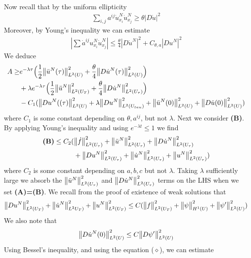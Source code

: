 \documentclass[12pt,a4paper]{report}
\newenvironment{proof}
{\begin{changemargin}{1cm}{0.5cm} 
	}%
	{\end{changemargin}
}
\begin{document}
\begin{proof}
\begin{align*}
\end{align*}
Now recall that by the uniform ellipticity
\begin{align*}
\sum_{i,j}a^{ij}\dot{u}^N_{x_i} \dot{u}^N_{x_j} \geq \theta |D\dot{u}|^2
\end{align*}
Moreover, by Young's inequality we can estimate
\begin{align*}
|\sum \dot{a}^{ij}u^N_{x_i}\dot{u}^N_{x_j}|\leq \frac{\theta}{4} |D\dot{u}^N|^2 + C_{\theta, a}|Du^N|^2
\end{align*}
We deduce
\begin{align*}
A \geq & e^{-\lambda \tau} \Big(\frac{1}{2}\bigl\lVert\ddot{u}^N(\tau)\bigr\rVert_{L^2(U)}^2 + \frac{\theta}{4}\bigl\lVert D\dot{u}^N(\tau)\bigr\rVert_{L^2(U)}^2 \Big) \\
& + \lambda e^{-\lambda \tau}\Big(  \frac{1}{2}\bigl\lVert\ddot{u}^N\bigr\rVert_{L^2(U_T)}^2 + \frac{\theta}{4}\bigl\lVert D\dot{u}^N\bigr\rVert_{L^2(U_{\tau})}^2 \Big) \\
& - C_1 (\bigl\lVert Du^N((\tau)\bigr\rVert_{L^2(U)}^2 + \lambda \bigl\lVert Du^N\bigr\rVert_{L^2(U_{tau})}^2 + \bigl\lVert\ddot{u}^N(0)\bigr\rVert_{L^2(U)}^2 + \bigl\lVert D\dot{u}(0)\bigr\rVert_{L^2(U)}^2)
\end{align*}
where $C_1$ is some constant depending on $\theta, a^{ij}$, but not $\lambda$. Next we consider \textbf{(B)}. By applying Young's inequality and using $e^{-\lambda t} \leq 1$ we find
\begin{align*}
\textbf{(B)} \leq C_2 (&\bigl\lVert\dot{f}\bigr\rVert_{L^2(U_{\tau})}^2 + \bigl\lVert\ddot{u}^N\bigr\rVert_{L^2(U_{\tau})}^2 + \bigl\lVert D\dot{u}^N\bigr\rVert_{L^2(U_{\tau})}^2  \\
& + \bigl\lVert Du^N\bigr\rVert_{L^2(U_{\tau})}^2 + \bigl\lVert\dot{u}^N\bigr\rVert_{L^2(U_{\tau})}^2 + \bigl\lVert u^N\bigr\rVert_{L^2(U_{\tau})}^2 )
\end{align*}
where $C_2$ is some constant depending on $a,b,c$ but not $\lambda$. Taking $\lambda$ sufficiently large we absorb the $\bigl\lVert\ddot{u}^N\bigr\rVert_{L^2(U_{\tau})}^2$ and $\bigl\lVert D\dot{u}^N\bigr\rVert_{L^2(U_{\tau})}^2$ terms on the LHS when we set \textbf{(A)=(B)}. We recall from the proof of existence of weak solutions that
\begin{align*}
\bigl\lVert Du^N\bigr\rVert_{L^2(U_T)}^2 + \bigl\lVert\dot{u}^N\bigr\rVert_{L^2U_T)}^2 + \bigl\lVert u^N\bigr\rVert_{L^2(U_T)}^2 \leq C (\bigl\lVert f\bigr\rVert_{L^2(U_T)}^2 + \bigl\lVert\psi\bigr\rVert_{H^1(U)}^2 + \bigl\lVert\psi'\bigr\rVert_{L^2(U)}^2)
\end{align*}
We also note that
\begin{align*}
\bigl\lVert D\dot{u}^N(0)\bigr\rVert_{L^2(U)}^2 \leq C \bigl\lVert D\psi'\bigr\rVert_{L^2(U)}^2
\end{align*}
Using Bessel's inequality, and using the equation ($\diamond$), we can estimate
\begin{align*}

\end{align*}
\end{proof}
\end{document}
